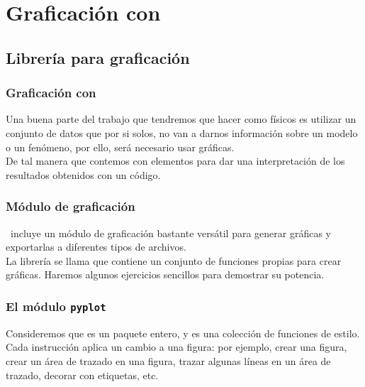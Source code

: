 \section{Graficación con \python}
\subsection{Librería para graficación}
\begin{frame}
\frametitle{Graficación con \python}
Una buena parte del trabajo que tendremos que hacer como físicos es utilizar un conjunto de datos que por si solos, no van a darnos información sobre un modelo o un fenómeno, por ello, será necesario usar gráficas.
\\
\bigskip
De tal manera que contemos con elementos para dar una interpretación de los resultados obtenidos con un código.
\end{frame}
\begin{frame}
\frametitle{Módulo de graficación}
\python\ incluye un módulo de graficación bastante versátil para generar gráficas y exportarlas a diferentes tipos de archivos.
\\
\medskip
La librería se llama  que contiene un conjunto de funciones propias para crear gráficas. Haremos algunos ejercicios sencillos para demostrar su potencia.
\end{frame}
\begin{frame}
\frametitle{El módulo \texttt{pyplot}}
Consideremos que  es un paquete entero, y  es una colección de funciones de estilo.
\\
\bigskip
\pause
Cada instrucción  aplica un cambio a una figura: por ejemplo, crear una figura, crear un área de trazado en una figura, trazar algunas líneas en un área de trazado, decorar con etiquetas, etc.
\end{frame}
